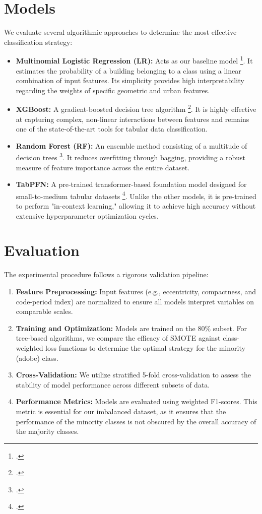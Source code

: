 \begin{refsection}
\section{Models}
We evaluate several algorithmic approaches to determine the most effective classification strategy:
\begin{itemize}
\item \textbf{Multinomial Logistic Regression (LR):} Acts as our baseline model \footcite{bishop_pattern_2016}. It estimates the probability of a building belonging to a class using a linear combination of input features. Its simplicity provides high interpretability regarding the weights of specific geometric and urban features.
\item \textbf{XGBoost:} A gradient-boosted decision tree algorithm \footcite{Chen:2016btl}. It is highly effective at capturing complex, non-linear interactions between features and remains one of the state-of-the-art tools for tabular data classification.
\item \textbf{Random Forest (RF):} An ensemble method consisting of a multitude of decision trees \footcite{parmar_review_2019}. It reduces overfitting through bagging, providing a robust measure of feature importance across the entire dataset.
\item \textbf{TabPFN:} A pre-trained transformer-based foundation model designed for small-to-medium tabular datasets \footcite{hollmann_accurate_2025, hollmann_tabpfn_2023}. Unlike the other models, it is pre-trained to perform "in-context learning," allowing it to achieve high accuracy without extensive hyperparameter optimization cycles.
\end{itemize}

\section{Evaluation}
The experimental procedure follows a rigorous validation pipeline:
\begin{enumerate}
\item \textbf{Feature Preprocessing:} Input features (e.g., eccentricity, compactness, and code-period index) are normalized to ensure all models interpret variables on comparable scales.
\item \textbf{Training and Optimization:} Models are trained on the 80\% subset. For tree-based algorithms, we compare the efficacy of SMOTE against class-weighted loss functions to determine the optimal strategy for the minority (adobe) class.
\item \textbf{Cross-Validation:} We utilize stratified 5-fold cross-validation to assess the stability of model performance across different subsets of data.
\item \textbf{Performance Metrics:} Models are evaluated using weighted F1-scores. This metric is essential for our imbalanced dataset, as it ensures that the performance of the minority classes is not obscured by the overall accuracy of the majority classes.
\end{enumerate}


\end{refsection}
